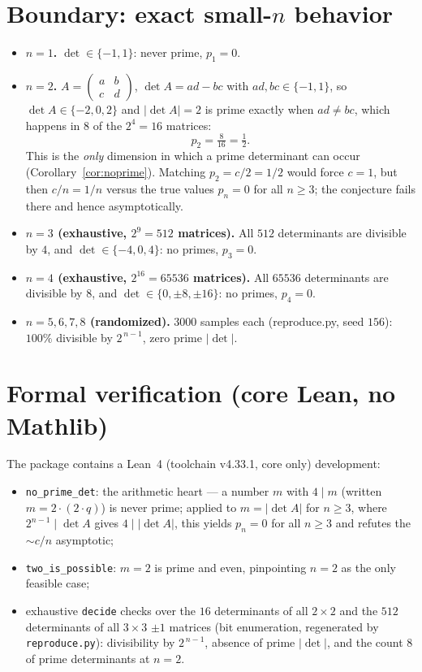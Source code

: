 \documentclass[11pt]{article}
\begin{document}
\section{Boundary: exact small-$n$ behavior}

\begin{itemize}
\item \textbf{$n=1$.} $\det\in\{-1,1\}$: never prime, $p_1=0$.
\item \textbf{$n=2$.} $A=\left(\begin{smallmatrix}a&b\\ c&d\end{smallmatrix}\right)$,
$\det A=ad-bc$ with $ad,bc\in\{-1,1\}$, so $\det A\in\{-2,0,2\}$ and $|\det A|=2$ is
prime exactly when $ad\ne bc$, which happens in $8$ of the $2^4=16$ matrices:
\[
p_2=\tfrac{8}{16}=\tfrac12 .
\]
This is the \emph{only} dimension in which a prime determinant can occur
(Corollary~\ref{cor:noprime}). Matching $p_2=c/2=1/2$ would force $c=1$, but then
$c/n=1/n$ versus the true values $p_n=0$ for all $n\ge3$; the conjecture fails there and
hence asymptotically.
\item \textbf{$n=3$ (exhaustive, $2^9=512$ matrices).} All $512$ determinants are
divisible by $4$, and $\det\in\{-4,0,4\}$: no primes, $p_3=0$.
\item \textbf{$n=4$ (exhaustive, $2^{16}=65536$ matrices).} All $65536$ determinants are
divisible by $8$, and $\det\in\{0,\pm8,\pm16\}$: no primes, $p_4=0$.
\item \textbf{$n=5,6,7,8$ (randomized).} $3000$ samples each (reproduce.py, seed
$156$): $100\%$ divisible by $2^{\,n-1}$, zero prime $|\det|$.
\end{itemize}

\section{Formal verification (core Lean, no Mathlib)}

The package contains a Lean~4 (toolchain v4.33.1, core only) development:

\begin{itemize}
\item \texttt{no\_prime\_det}: the arithmetic heart — a number $m$ with $4 \mid m$
(written $m = 2\cdot(2\cdot q)$) is never prime; applied to $m = |\det A|$ for
$n \ge 3$, where $2^{n-1} \mid \det A$ gives $4 \mid |\det A|$, this yields
$p_n = 0$ for all $n \ge 3$ and refutes the $\sim c/n$ asymptotic;
\item \texttt{two\_is\_possible}: $m=2$ is prime and even, pinpointing
$n=2$ as the only feasible case;
\item exhaustive \texttt{decide} checks over the $16$ determinants of all
$2\times2$ and the $512$ determinants of all $3\times3$ $\pm1$ matrices (bit
enumeration, regenerated by \texttt{reproduce.py}): divisibility by
$2^{\,n-1}$, absence of prime $|\det|$, and the count $8$ of prime
determinants at $n=2$.
\end{itemize}
\end{document}
